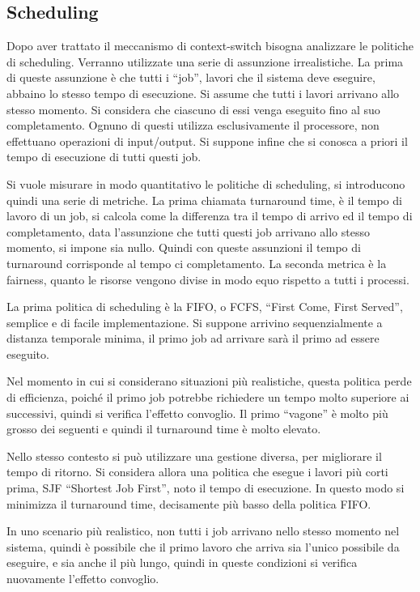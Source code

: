 \documentclass{article}
\numberwithin{equation}{subsection}
\begin{document}
\subsection{Scheduling}

Dopo aver trattato il meccanismo di context-switch bisogna analizzare le politiche di scheduling. 
Verranno utilizzate una serie di assunzione irrealistiche. 
La prima di queste assunzione è che tutti i ``job'', lavori che il sistema deve eseguire, abbaino lo stesso tempo di esecuzione. Si assume che tutti i lavori arrivano 
allo stesso momento. Si considera che ciascuno di essi venga eseguito fino al suo completamento. Ognuno di questi utilizza esclusivamente il processore, non effettuano 
operazioni di input/output. Si suppone infine che si conosca a priori il tempo di esecuzione di tutti questi job. 

Si vuole misurare in modo quantitativo le politiche di scheduling, si introducono quindi una serie di metriche. La prima chiamata turnaround time, è il tempo di 
lavoro di un job, si calcola come la differenza tra il tempo di arrivo ed il tempo di completamento, data l'assunzione che tutti questi job arrivano allo stesso momento, 
si impone sia nullo. Quindi con queste assunzioni il tempo di turnaround corrisponde al tempo ci completamento. 
La seconda metrica è la fairness, quanto le risorse vengono divise in modo equo rispetto a tutti i processi. 

La prima politica di scheduling è la FIFO, o FCFS, ``First Come, First Served'', semplice e di facile implementazione. Si suppone arrivino sequenzialmente a distanza 
temporale minima, il primo job ad arrivare sarà il primo ad essere eseguito. 


Nel momento in cui si considerano situazioni più realistiche, questa politica perde di efficienza, poiché il primo job potrebbe richiedere un tempo molto superiore ai 
successivi, quindi si verifica l'effetto convoglio. Il primo ``vagone'' è molto più grosso dei seguenti e quindi il turnaround time è molto elevato. 

Nello stesso contesto si può utilizzare una gestione diversa, per migliorare il tempo di ritorno. Si considera allora una politica che esegue i lavori più corti prima, 
SJF ``Shortest Job First'', noto il tempo di esecuzione. In questo modo si minimizza il turnaround time, decisamente più basso della politica FIFO. 

In uno scenario più realistico, non tutti i job  arrivano nello stesso momento nel sistema, quindi è possibile che il primo lavoro che arriva sia l'unico possibile da 
eseguire, e sia anche il più lungo, quindi in queste condizioni si verifica nuovamente l'effetto convoglio. 
\end{document}

